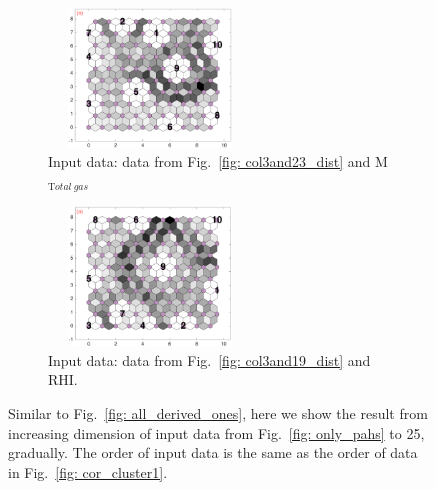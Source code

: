 \begin{figure}
\begin{subfigure}[b]{0.25\textwidth}
        \includegraphics[width=54mm, height=37mm]{../../images0.01/M31/2D/diff_dimension/combine_2D_data_between_cols3and24.png}
        \caption{Input data: data from Fig.~\ref{fig: col3and23_dist} and M$_{{\mathrm Total\ gas}}$}
        \label{fig: col3and24_dist}
    \end{subfigure}
            \hfill
    \begin{subfigure}[b]{0.25\textwidth}
        \centering
        \includegraphics[width=54mm, height=37mm ]{../../images0.01/M31/2D/diff_dimension/combine_2D_data_between_cols3and25.png}
        \caption{Input data: data from Fig.~\ref{fig: col3and19_dist} and RHI.}
        \label{fig: col3and25_dist}
    \end{subfigure}
    \caption{Similar to Fig.~\ref{fig: all_derived_ones}, here we show the result from increasing dimension of input data from Fig.~\ref{fig: only_pahs} to 25, gradually. The order of input data is the same as the order of data in Fig.~\ref{fig: cor_cluster1}.}
    \label{fig: inc_D_col3s}
\end{figure}